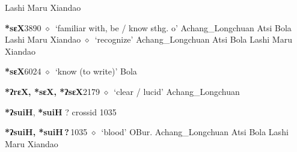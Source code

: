 \begin{list}{}{\leftmargin=1.5em \itemindent=-1.5em}
\hspace{1ex}
         Lashi 
\hspace{1ex}
         Maru 
\hspace{1ex}
         Xiandao 
  \item {\footnotesize \textbf{*sɛX}}{\tiny 3890}
\hspace{1ex}
         $\diamond$~`familiar with, be / know sthg. o'
         Achang\_Longchuan 
\hspace{1ex}
         Atsi 
\hspace{1ex}
         Bola 
\hspace{1ex}
         Lashi 
\hspace{1ex}
         Maru 
\hspace{1ex}
         Xiandao 
\hspace{1ex}
         $\diamond$~`recognize'
         Achang\_Longchuan 
\hspace{1ex}
         Atsi 
\hspace{1ex}
         Bola 
\hspace{1ex}
         Lashi 
\hspace{1ex}
         Maru 
\hspace{1ex}
         Xiandao 
  \item {\footnotesize \textbf{*sɛX}}{\tiny 6024}
\hspace{1ex}
         $\diamond$~`know (to write)'
         Bola 
  \item {\footnotesize \textbf{*ʔrɛX, *sɛX, *ʔsɛX}}{\tiny 2179}
\hspace{1ex}
         $\diamond$~`clear / lucid'
         Achang\_Longchuan 
  \end{list}
\item
\textbf{*ʔsuiH}, \textbf{*suiH}
?
  {\tiny crossid 1035}
  \begin{list}{}{\leftmargin=1.5em \itemindent=-1.5em}
  \item {\footnotesize \textbf{*ʔsuiH, *suiH\,?\,}}{\tiny 1035}
         $\diamond$~`blood'
         OBur. 
\hspace{1ex}
         Achang\_Longchuan 
\hspace{1ex}
         Atsi 
\hspace{1ex}
         Bola 
\hspace{1ex}
         Lashi 
\hspace{1ex}
         Maru 
\hspace{1ex}
         Xiandao 
  \end{list}
